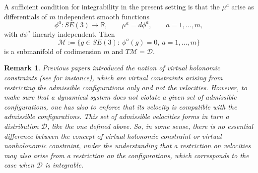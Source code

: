 \documentclass[letterpaper, 10 pt, conference]{ieeeconf}
\newcommand{\D}{\mathcal{D}}
\newtheorem{remark}{Remark}
\begin{document}
A sufficient condition for integrability in the present setting is that the $\mu^a$ arise as differentials of $m$ independent smooth functions
\begin{equation}\label{eq:holonomic-constraints}
\phi^a:SE(3)\to\mathbb{R},\qquad \mu^a = d\phi^a,\qquad a=1,\dots,m,
\end{equation}
with $d\phi^{a}$ linearly independent. Then
\begin{equation}\label{eq:submanifold-levelset}
\mathcal{M}:=\{g\in SE(3):\ \phi^a(g)=0,\ a=1,\dots,m\}
\end{equation}
is a submanifold of codimension $m$ and $T\mathcal{M}=\D$.

\begin{remark}
    Previous papers introduced the notion of virtual holonomic constraints (see \cite{maggiore2012virtual} for instance), which are virtual constraints arising from restricting the admissible configurations only and not the velocities. However, to make sure that a dynamical system does not violate a given set of admissible configurations, one has also to enforce that its velocity is compatible with the admissible configurations. This set of admissible velocities forms in turn a distribution $\D$, like the one defined above. So, in some sense, there is no essential difference between the concept of virtual holonomic constraint or virtual nonholonomic constraint, under the understanding that a restriction on velocities may also arise from a restriction on the configurations, which corresponds to the case when $\D$ is integrable. 
\end{remark}



\end{document}
